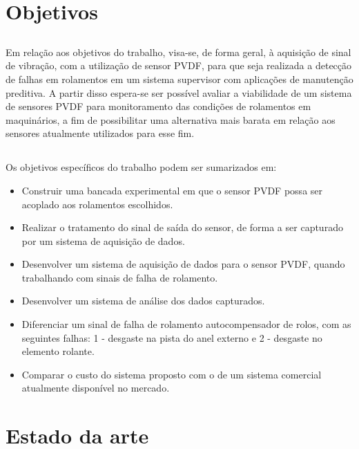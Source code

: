 \documentclass[
	12pt,				
	oneside,			
	a4paper,			
	english,			
	brazil,			
	]{abntex2ppgsi}
\begin{document}
\chapter{Objetivos}

\section{}

Em relação aos objetivos do trabalho, visa-se, de forma geral, à aquisição de sinal de vibração, com a utilização de sensor PVDF, para que seja realizada a detecção de falhas em rolamentos em um sistema supervisor com aplicações de manutenção preditiva. A partir disso espera-se ser possível avaliar a viabilidade de um sistema de sensores PVDF para monitoramento das condições de rolamentos em maquinários, a fim de possibilitar uma alternativa mais barata em relação aos sensores atualmente utilizados para esse fim.

\section{}

Os objetivos específicos do trabalho podem ser sumarizados em:

\begin{itemize}
	\item Construir uma bancada experimental em que o sensor PVDF possa ser acoplado aos rolamentos escolhidos.
	\item Realizar o tratamento do sinal de saída do sensor, de forma a ser capturado por um sistema de aquisição de dados.
	\item Desenvolver um sistema de aquisição de dados para o sensor PVDF, quando trabalhando com sinais de falha de rolamento.
	\item Desenvolver um sistema de análise dos dados capturados.
	\item Diferenciar um sinal de falha de rolamento autocompensador de rolos, com as seguintes falhas: 1 - desgaste na pista do anel externo e 2 - desgaste no elemento rolante.
	\item Comparar o custo do sistema proposto com o de um sistema comercial atualmente disponível no mercado.
\end{itemize}

\newpage
\chapter{\textbf{Estado da arte}}
\end{document}
